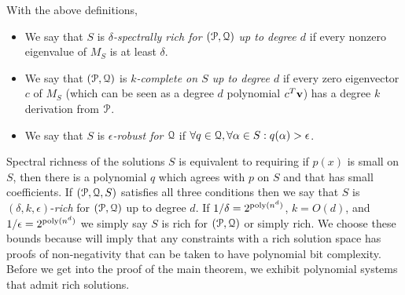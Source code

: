 \begin{definition}\label{def:nice}
With the above definitions, 
\begin{itemize}
\item We say that $S$ is \emph{$\delta$-spectrally rich for $(\mathcal P, \mathcal Q)$ up to degree $d$} if every nonzero eigenvalue of $M_S$ is at least $\delta$.
\item We say that $(\mathcal P, \mathcal Q)$ is \emph{$k$-complete on $S$ up to degree $d$} if every zero eigenvector $c$ of $M_S$ (which can be seen as a degree $d$ polynomial $c^T{\bf v}$) has a degree $k$ derivation from $\mathcal P$. 
\item We say that $S$ is \emph{$\epsilon$-robust for $\mathcal Q$} if $\forall q \in \mathcal Q, \forall \alpha \in S: q(\alpha) > \epsilon$.
\end{itemize}
\end{definition}
Spectral richness of the solutions $S$ is equivalent to requiring if $p(x)$ is small on $S$, then there is a polynomial $q$ which agrees with $p$ on $S$ and that has small coefficients. If $(\mathcal P, \mathcal Q, S)$ satisfies all three conditions then we say that $S$ is $(\delta, k, \epsilon)$-\emph{rich} for $(\mathcal P, \mathcal Q)$ up to degree $d$. If $1/\delta = 2^{\operatorname{poly}(n^d)}$, $k = O(d)$, and $1/\epsilon = 2^{\operatorname{poly}(n^d)}$ we simply say $S$ is rich for $(\mathcal P, \mathcal Q)$ or simply rich. We choose these bounds because  will imply that any constraints with a rich solution space has proofs of non-negativity that can be taken to have polynomial bit complexity. Before we get into the proof of the main theorem, we exhibit polynomial systems that admit rich solutions.
